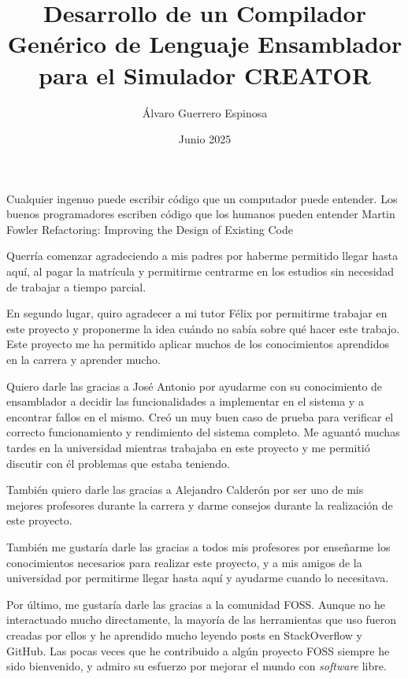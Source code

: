 \documentclass[es]{uc3mthesisIEEE}
\title{Desarrollo de un Compilador Genérico de Lenguaje Ensamblador para el Simulador CREATOR}
\author{Álvaro Guerrero Espinosa}
\date{Junio 2025}
\begin{document}
  \makecover


  \makeepigraph
    {Cualquier ingenuo puede escribir código que un computador puede entender. Los buenos programadores escriben código que los humanos pueden entender}  %
    {Martin Fowler}  %
    {Refactoring: Improving the Design of Existing Code}  %


  \begin{acknowledgements}
    Querría comenzar agradeciendo a mis padres por haberme permitido llegar
    hasta aquí, al pagar la matrícula y permitirme centrarme en los estudios sin
    necesidad de trabajar a tiempo parcial.

    En segundo lugar, quiro agradecer a mi tutor Félix por permitirme trabajar
    en este proyecto y proponerme la idea cuándo no sabía sobre qué hacer este
    trabajo. Este proyecto me ha permitido aplicar muchos de los conocimientos
    aprendidos en la carrera y aprender mucho.

    Quiero darle las gracias a José Antonio por ayudarme con su conocimiento de
    ensamblador a decidir las funcionalidades a implementar en el sistema y a
    encontrar fallos en el mismo. Creó un muy buen caso de prueba para verificar
    el correcto funcionamiento y rendimiento del sistema completo. Me aguantó
    muchas tardes en la universidad mientras trabajaba en este proyecto y me
    permitió discutir con él problemas que estaba teniendo.

    También quiero darle las gracias a Alejandro Calderón por ser uno de mis
    mejores profesores durante la carrera y darme consejos durante la
    realización de este proyecto.

    También me gustaría darle las gracias a todos mis profesores por enseñarme
    los conocimientos necesarios para realizar este proyecto, y a mis amigos de
    la universidad por permitirme llegar hasta aquí y ayudarme cuando lo
    necesitava.

    Por último, me gustaría darle las gracias a la comunidad FOSS. Aunque no he
    interactuado mucho directamente, la mayoría de las herramientas que uso
    fueron creadas por ellos y he aprendido mucho leyendo posts en StackOverflow
    y GitHub. Las pocas veces que he contribuido a algún proyecto FOSS siempre
    he sido bienvenido, y admiro su esfuerzo por mejorar el mundo con
    \textit{software} libre.
  \end{acknowledgements}
\end{document}

